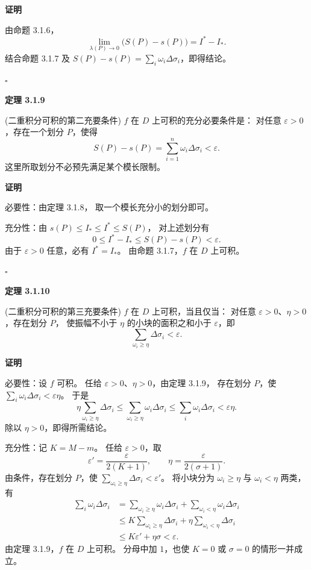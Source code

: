 \textbf{证明}

由命题 3.1.6，
\[
\lim_{\lambda(P)\to0}\bigl(S(P)-s(P)\bigr)=I^*-I_*.
\]
结合命题 3.1.7 及
$S(P)-s(P)=\sum_i\omega_i\Delta\sigma_i$，即得结论。


$\square$






\textbf{定理 3.1.9}

(二重积分可积的第二充要条件)
$f$ 在 $D$ 上可积的充分必要条件是：
对任意 $\varepsilon>0$，存在一个划分 $P$，使得
\[
S(P)-s(P)=\sum_{i=1}^n\omega_i\Delta\sigma_i<\varepsilon.
\]
这里所取划分不必预先满足某个模长限制。





\textbf{证明}

必要性：由定理 3.1.8，
取一个模长充分小的划分即可。

充分性：由 $s(P)\le I_*\le I^*\le S(P)$，
对上述划分有
\[
0\le I^*-I_*\le S(P)-s(P)<\varepsilon.
\]
由于 $\varepsilon>0$ 任意，必有 $I^*=I_*$。
由命题 3.1.7，$f$ 在 $D$ 上可积。


$\square$






\textbf{定理 3.1.10}

(二重积分可积的第三充要条件)
$f$ 在 $D$ 上可积，当且仅当：
对任意 $\varepsilon>0$、$\eta>0$，存在划分 $P$，
使振幅不小于 $\eta$ 的小块的面积之和小于 $\varepsilon$，即
\[
\sum_{\omega_i\ge\eta}\Delta\sigma_i<\varepsilon.
\]





\textbf{证明}

必要性：设 $f$ 可积。
任给 $\varepsilon>0$、$\eta>0$，由定理 3.1.9，
存在划分 $P$，使 $\sum_i\omega_i\Delta\sigma_i<\varepsilon\eta$。
于是
\[
\eta\sum_{\omega_i\ge\eta}\Delta\sigma_i
\le\sum_{\omega_i\ge\eta}\omega_i\Delta\sigma_i
\le\sum_i\omega_i\Delta\sigma_i<\varepsilon\eta.
\]
除以 $\eta>0$，即得所需结论。

充分性：记 $K=M-m$。
任给 $\varepsilon>0$，取
\[
\varepsilon'=\frac{\varepsilon}{2(K+1)},\qquad
\eta=\frac{\varepsilon}{2(\sigma+1)}.
\]
由条件，存在划分 $P$，使
$\sum_{\omega_i\ge\eta}\Delta\sigma_i<\varepsilon'$。
将小块分为 $\omega_i\ge\eta$ 与 $\omega_i<\eta$ 两类，有
\[
\begin{aligned}
\sum_i\omega_i\Delta\sigma_i
&=\sum_{\omega_i\ge\eta}\omega_i\Delta\sigma_i
+\sum_{\omega_i<\eta}\omega_i\Delta\sigma_i\\
&\le K\sum_{\omega_i\ge\eta}\Delta\sigma_i
+\eta\sum_{\omega_i<\eta}\Delta\sigma_i\\
&\le K\varepsilon'+\eta\sigma
<\varepsilon.
\end{aligned}
\]
由定理 3.1.9，$f$ 在 $D$ 上可积。
分母中加 $1$，也使 $K=0$ 或 $\sigma=0$ 的情形一并成立。


